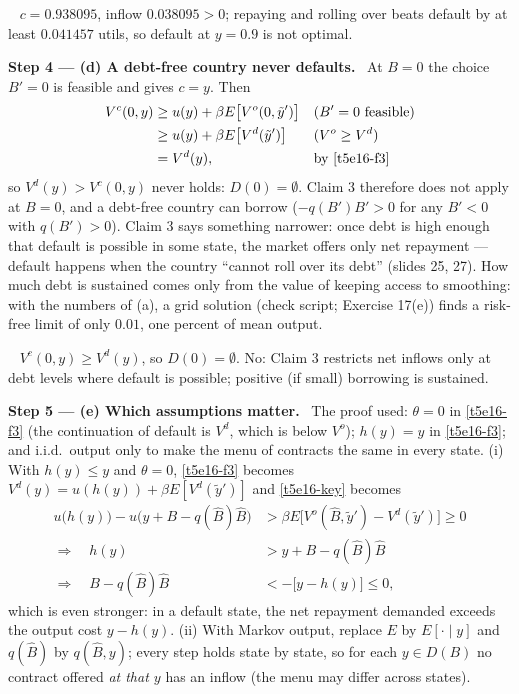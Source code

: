 \documentclass[11pt,a4paper]{article}
\newcommand{\step}[2]{\par\medskip\noindent\textbf{Step #1 --- #2.}~}
\newcommand{\answer}[1]{\par\smallskip\noindent\fbox{\textbf{Answer #1.}}~}
\begin{document}
\answer{(c)} $c=0.938095$, inflow $0.038095>0$; repaying and rolling over beats default by at least $0.041457$ utils, so default at $y=0.9$ is not optimal.

\step{4}{(d) A debt-free country never defaults} At $B=0$ the choice $B'=0$ is feasible and gives $c=y$. Then
\begin{align}
  V^c(0,y) &\ge u(y)+\beta E\big[V^o(0,\tilde y')\big] && (B'=0 \text{ feasible}) \nonumber\\
           &\ge u(y)+\beta E\big[V^d(\tilde y')\big] && (V^o\ge V^d) \nonumber\\
           &= V^d(y), && \text{by \eqref{t5e16-f3}} \nonumber
\end{align}
so $V^d(y)>V^c(0,y)$ never holds: $D(0)=\emptyset$. Claim 3 therefore does not apply at $B=0$, and a debt-free country can borrow ($-q(B')B'>0$ for any $B'<0$ with $q(B')>0$).
Claim 3 says something narrower: once debt is high enough that default is possible in some state, the market offers only net repayment --- default happens when the
country ``cannot roll over its debt'' (slides 25, 27). How much debt is sustained comes only from the value of keeping access to smoothing: with the numbers of (a),
a grid solution (check script; Exercise 17(e)) finds a risk-free limit of only $0.01$, one percent of mean output.

\answer{(d)} $V^c(0,y)\ge V^d(y)$, so $D(0)=\emptyset$. No: Claim 3 restricts net inflows only at debt levels where default is possible; positive (if small) borrowing is sustained.

\step{5}{(e) Which assumptions matter} The proof used: $\theta=0$ in \eqref{t5e16-f3} (the continuation of default is $V^d$, which is below $V^o$); $h(y)=y$ in \eqref{t5e16-f3}; and
i.i.d.\ output only to make the menu of contracts the same in every state.
(i) With $h(y)\le y$ and $\theta=0$, \eqref{t5e16-f3} becomes $V^d(y)=u(h(y))+\beta E[V^d(\tilde y')]$ and \eqref{t5e16-key} becomes
\begin{align}
  u\big(h(y)\big)-u\big(y+B-q(\hat B)\hat B\big) &> \beta E\big[V^o(\hat B,\tilde y')-V^d(\tilde y')\big] \ge 0 \nonumber\\
  \Rightarrow\quad h(y) &> y+B-q(\hat B)\hat B \nonumber\\
  \Rightarrow\quad B-q(\hat B)\hat B &< -\big[y-h(y)\big] \le 0, \nonumber
\end{align}
which is even stronger: in a default state, the net repayment demanded exceeds the output cost $y-h(y)$.
(ii) With Markov output, replace $E$ by $E[\cdot\mid y]$ and $q(\hat B)$ by $q(\hat B,y)$; every step holds state by state, so for each $y\in D(B)$ no contract offered
\emph{at that $y$} has an inflow (the menu may differ across states).
\end{document}
